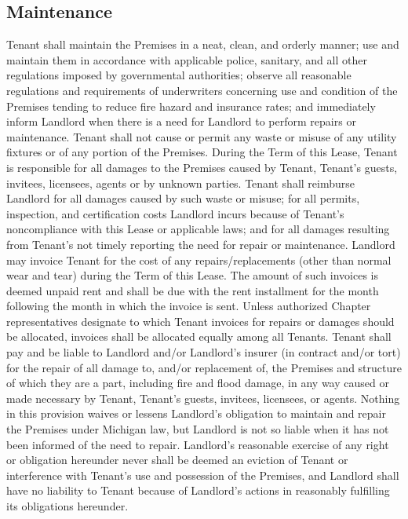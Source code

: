 \documentclass{article}
\begin{document}
\subsection{Maintenance}
Tenant shall maintain the Premises in a neat, clean, and orderly manner; use and
maintain them in accordance with applicable police, sanitary, and all other
regulations imposed by governmental authorities; observe all reasonable
regulations and requirements of underwriters concerning use and condition of the
Premises tending to reduce fire hazard and insurance rates; and immediately
inform Landlord when there is a need for Landlord to perform repairs or
maintenance. Tenant shall not cause or permit any waste or misuse of any utility
fixtures or of any portion of the Premises. During the Term of this Lease,
Tenant is responsible for all damages to the Premises caused by Tenant, Tenant’s
guests, invitees, licensees, agents or by unknown parties. Tenant shall
reimburse Landlord for all damages caused by such waste or misuse; for all
permits, inspection, and certification costs Landlord incurs because of Tenant’s
noncompliance with this Lease or applicable laws; and for all damages resulting
from Tenant’s not timely reporting the need for repair or maintenance. Landlord
may invoice Tenant for the cost of any repairs\slash replacements (other than
normal wear and tear) during the Term of this Lease. The amount of such invoices
is deemed unpaid rent and shall be due with the rent installment for the month
following the month in which the invoice is sent. Unless authorized Chapter
representatives designate to which Tenant invoices for repairs or damages should
be allocated, invoices shall be allocated equally among all Tenants. Tenant
shall pay and be liable to Landlord and/or Landlord’s insurer (in contract
and/or tort) for the repair of all damage to, and/or replacement of, the
Premises and structure of which they are a part, including fire and flood
damage, in any way caused or made necessary by Tenant, Tenant’s guests,
invitees, licensees, or agents. Nothing in this provision waives or lessens
Landlord’s obligation to maintain and repair the Premises under Michigan law,
but Landlord is not so liable when it has not been informed of the need to
repair. Landlord’s reasonable exercise of any right or obligation hereunder
never shall be deemed an eviction of Tenant or interference with Tenant’s use
and possession of the Premises, and Landlord shall have no liability to Tenant
because of Landlord’s actions in reasonably fulfilling its obligations
hereunder.
\end{document}

